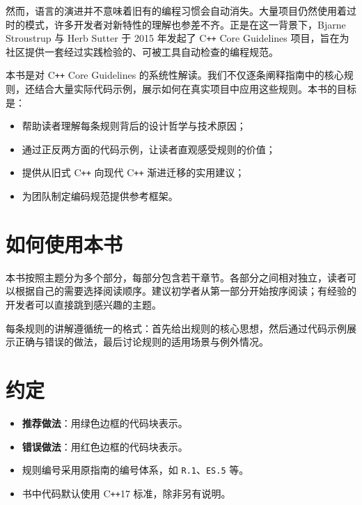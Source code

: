 \documentclass[12pt,a4paper,fontset=fandol]{ctexbook}
\begin{document}
然而，语言的演进并不意味着旧有的编程习惯会自动消失。大量项目仍然使用着过时的模式，许多开发者对新特性的理解也参差不齐。正是在这一背景下，Bjarne Stroustrup 与 Herb Sutter 于 2015 年发起了 C\texttt{++} Core Guidelines 项目，旨在为社区提供一套经过实践检验的、可被工具自动检查的编程规范。

本书是对 C\texttt{++} Core Guidelines 的系统性解读。我们不仅逐条阐释指南中的核心规则，还结合大量实际代码示例，展示如何在真实项目中应用这些规则。本书的目标是：

\begin{itemize}
  \item 帮助读者理解每条规则背后的设计哲学与技术原因；
  \item 通过正反两方面的代码示例，让读者直观感受规则的价值；
  \item 提供从旧式 C\texttt{++} 向现代 C\texttt{++} 渐进迁移的实用建议；
  \item 为团队制定编码规范提供参考框架。
\end{itemize}

\section*{如何使用本书}

本书按照主题分为多个部分，每部分包含若干章节。各部分之间相对独立，读者可以根据自己的需要选择阅读顺序。建议初学者从第一部分开始按序阅读；有经验的开发者可以直接跳到感兴趣的主题。

每条规则的讲解遵循统一的格式：首先给出规则的核心思想，然后通过代码示例展示正确与错误的做法，最后讨论规则的适用场景与例外情况。

\section*{约定}

\begin{itemize}
  \item \textbf{推荐做法}：用绿色边框的代码块表示。
  \item \textbf{错误做法}：用红色边框的代码块表示。
  \item 规则编号采用原指南的编号体系，如 \texttt{R.1}、\texttt{ES.5} 等。
  \item 书中代码默认使用 C\texttt{++}17 标准，除非另有说明。
\end{itemize}

\tableofcontents
\end{document}
